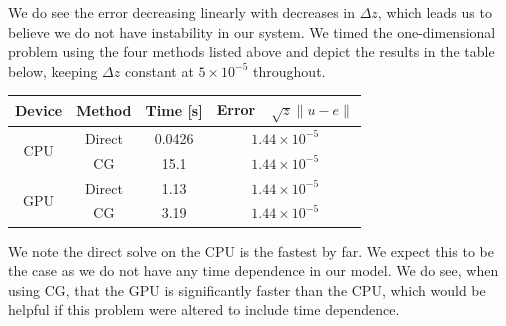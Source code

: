 \documentclass[11pt]{article}
\begin{document}
	We do see the error decreasing linearly with decreases in $ \Delta z $, which leads us to believe we do not have instability in our system.
	\newline\indent
	We timed the one-dimensional problem using the four methods listed above and depict the results in the table below, keeping $ \Delta z $ constant at $ 5\times10^{-5} $ throughout.
	\begin{center}
		\renewcommand{\arraystretch}{1.5}
		\begin{tabular}{c|c|c|c}
			\hline\hline
			\textbf{Device}&\textbf{Method}&\textbf{Time [s]}&\textbf{Error~~$\sqrt{z}\lVert u-e\rVert $}\\
			\hline
			\multirow{2}{*}{CPU}&Direct&0.0426&$1.44\times 10^{-5}$\\
			&CG&15.1&$1.44\times 10^{-5}$\\
			\hline
			\multirow{2}{*}{GPU}&Direct&1.13&$1.44\times 10^{-5}$\\
			&CG&3.19&$1.44\times 10^{-5}$\\
			\hline
		\end{tabular}
	\end{center}
	We note the direct solve on the CPU is the fastest by far. We expect this to be the case as we do not have any time dependence in our model. We do see, when using CG, that the GPU is significantly faster than the CPU, which would be helpful if this problem were altered to include time dependence.
\end{document}
